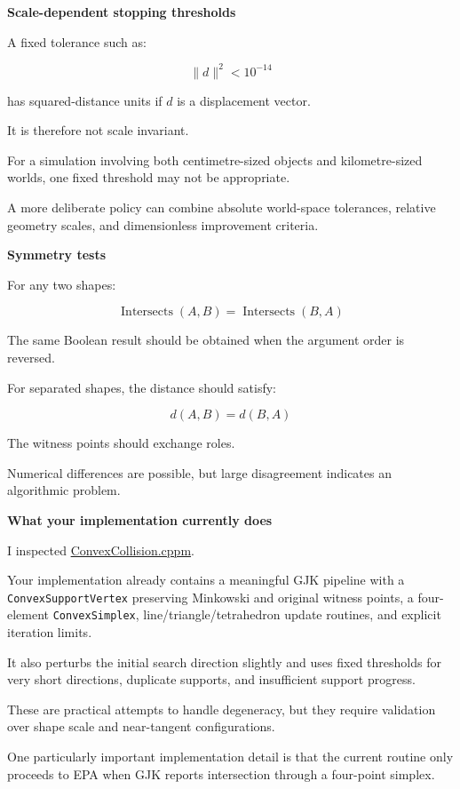 \textbf{Scale-dependent stopping thresholds}

A fixed tolerance such as:

\[
\|d\|^2<10^{-14}
\]

has squared-distance units if \(d\) is a displacement vector.

It is therefore not scale invariant.

For a simulation involving both centimetre-sized objects and kilometre-sized worlds, one fixed threshold may not be appropriate.

A more deliberate policy can combine absolute world-space tolerances, relative geometry scales, and dimensionless improvement criteria.

\textbf{Symmetry tests}

For any two shapes:

\[
\operatorname{Intersects}(A,B) = \operatorname{Intersects}(B,A)
\]

The same Boolean result should be obtained when the argument order is reversed.

For separated shapes, the distance should satisfy:

\[
d(A,B)=d(B,A)
\]

The witness points should exchange roles.

Numerical differences are possible, but large disagreement indicates an algorithmic problem.

\textbf{What your implementation currently does}

I inspected \href{https://github.com/swayam8624/KairoPhysicsEngine/blob/main/ConvexCollision.cppm?utm_source=chatgpt.com}{ConvexCollision.cppm}.

Your implementation already contains a meaningful GJK pipeline with a \texttt{ConvexSupportVertex} preserving Minkowski and original witness points, a four-element \texttt{ConvexSimplex}, line/triangle/tetrahedron update routines, and explicit iteration limits.

It also perturbs the initial search direction slightly and uses fixed thresholds for very short directions, duplicate supports, and insufficient support progress.

These are practical attempts to handle degeneracy, but they require validation over shape scale and near-tangent configurations.

One particularly important implementation detail is that the current routine only proceeds to EPA when GJK reports intersection through a four-point simplex.

